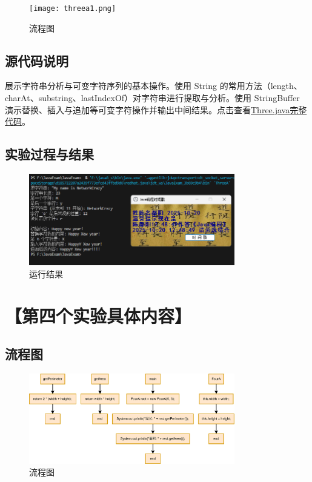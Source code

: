 \documentclass[12pt,a4paper]{article}
\begin{document}
\begin{figure}[H]
\centering
\texttt{[image: threea1.png]}
\caption{流程图}
\end{figure}

\subsection*{源代码说明}
展示字符串分析与可变字符序列的基本操作。使用 String 的常用方法（length、charAt、substring、lastIndexOf）对字符串进行提取与分析。使用 StringBuffer 演示替换、插入与追加等可变字符操作并输出中间结果。点击查看\hyperref[sec:three]{Three.java完整代码}。

\subsection*{实验过程与结果}

\begin{figure}[H]
\centering
\includegraphics[width=0.8\textwidth,height=0.8\textheight,keepaspectratio]{threea.png}
\caption{运行结果}
\end{figure}

\section*{【第四个实验具体内容】}
\subsection*{流程图}

\begin{figure}[H]
\centering
\includegraphics[width=0.8\textwidth,height=0.8\textheight,keepaspectratio]{foura1.png}
\caption{流程图}
\end{figure}
\end{document}
